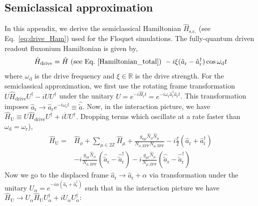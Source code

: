 \documentclass[%
reprint,
superscriptaddress,
 amsmath,amssymb,
 aps,
 prx,
longbibliography,
floatfix,
]{revtex4-2}
\begin{document}
\subsection{Semiclassical approximation}\label{app:semi-classical}
In this appendix, we derive the semiclassical Hamiltonian $\hat H_\textrm{s.c.}$ (see Eq.~\ref{eq:drive_Ham}) used for the Floquet simulations. The fully-quantum driven readout fluxonium Hamiltonian is given by,
\begin{align}
    \hat H_\textrm{drive}=\hat H \textrm{ (see Eq.~\ref{Hamiltonian_total}) }-i\xi(\hat a_\textrm{r}-\hat a_\textrm{r}^\dagger)\cos{\omega_\textrm{d} t}
\end{align}
where $\omega_\textrm{d}$ is the drive frequency and $\xi\in \mathbb{R}$ is the drive strength. For the semiclassical approximation, we first use the rotating frame transformation $U\hat H_\textrm{drive}U^\dagger-i\dot{U}U^\dagger$ under the unitary $U=e^{-i\hat H_\textrm{r}t}=e^{-i\omega_\textrm{r} \hat a_\textrm{r}^\dagger \hat a_\textrm{r}t}$. This transformation imposes $\hat a_\textrm{r}\rightarrow \hat a_\textrm{r}e^{-i\omega_\textrm{r}t}\equiv\hat{\tilde{a}}$. Now, in the interaction picture, we have $\hat H_\textrm{U} \equiv U\hat H_\textrm{drive}U^\dagger+i\dot{U}U^\dagger$. Dropping terms which oscillate at a rate faster than $\omega_\textrm{d}=\omega_\textrm{r}$),
\begin{align}
   \hat H_\textrm{U} =&\hat H_\phi+\sum_{\mu\in 2\mathbb{Z}}\hat H_\mu+\frac{g_{\phi\mu}\hat N_\phi\hat N_\mu}{N_{\phi,\textrm{ZPF}}N_{\mu,\textrm{ZPF}}}-i\frac{\xi}{2}(\hat a_\textrm{r}+\hat a_\textrm{r}^\dagger)\nonumber\\ 
   &-i\frac{g_{\phi\textrm{r}}\hat N_\phi}{N_{\phi,\textrm{ZPF}}}(\hat {\tilde{a}}_\textrm{r}-\hat {\tilde{a}}_\textrm{r}^\dagger)-i\frac{g_{\mu\textrm{r}}\hat N_\mu}{N_{\mu,\textrm{ZPF}}}(\hat {\tilde{a}}_\textrm{r}-\hat {\tilde{a}}_\textrm{r}^\dagger)
\end{align}
Now we go to the displaced frame $\hat a_\textrm{r}\rightarrow \hat a_\textrm{r}+\alpha$ via transformation under the unitary $U_\alpha=e^{-i\alpha(\hat a_\textrm{r}+\hat a_\textrm{r}^\dagger)}$ such that in the interaction picture we have $\hat H_\textrm{U} \rightarrow U_\alpha\hat H_\textrm{U}U_\alpha^\dagger+i\dot{U}_\alpha U_\alpha^\dagger$: 
\end{document}
